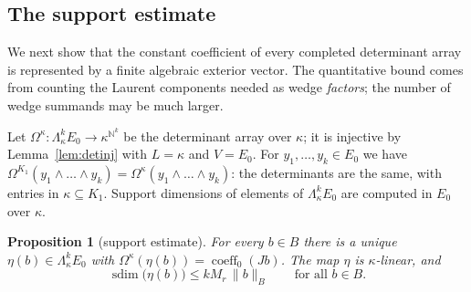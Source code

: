 \documentclass[11pt]{amsart}
\newtheorem{proposition}[theorem]{Proposition}
\theoremstyle{definition}
\theoremstyle{remark}
\numberwithin{equation}{section}
\newcommand{\N}{\mathbb N}
\newcommand{\norm}[1]{\lVert #1\rVert}
\newcommand{\coeff}{\operatorname{coeff}}
\newcommand{\sdim}{\operatorname{sdim}}
\begin{document}
\subsection{The support estimate}\label{ssec:suppest}
We next show that the constant coefficient of every completed determinant array is represented by a finite
algebraic exterior vector. The quantitative bound comes from counting the Laurent components needed as wedge
\emph{factors}; the number of wedge summands may be much larger.

Let $\Omega^\kappa\colon\Lambda^k_\kappa E_0\to\kappa^{\N^k}$ be the determinant array over $\kappa$; it is injective by
Lemma~\ref{lem:detinj} with $L=\kappa$ and $V=E_0$. For $y_1,\dots,y_k\in E_0$ we have
$\Omega^{K_1}(y_1\wedge\dots\wedge y_k)=\Omega^\kappa(y_1\wedge\dots\wedge y_k)$: the determinants are the same, with entries in
$\kappa\subseteq K_1$. Support dimensions of elements of $\Lambda^k_\kappa E_0$ are computed in $E_0$ over $\kappa$.

\begin{proposition}[support estimate]\label{prop:supp}
For every $b\in B$ there is a unique $\eta(b)\in\Lambda^k_\kappa E_0$ with $\Omega^\kappa(\eta(b))=\coeff_0(Jb)$. The map $\eta$ is
$\kappa$\nobreakdash-linear, and
\begin{equation}\label{eq:suppest}
\sdim\bigl(\eta(b)\bigr)\le kM_r\,\norm b_B\qquad\text{for all }b\in B .
\end{equation}
\end{proposition}
\end{document}

